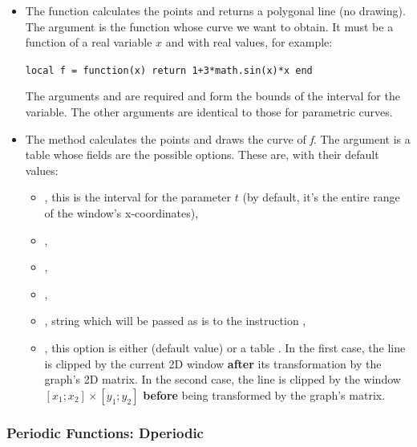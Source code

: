 \begin{itemize}
    \item The function  calculates the points and returns a polygonal line (no drawing). The argument  is the function whose curve we want to obtain. It must be a function of a real variable $x$ and with real values, for example:

\texttt{local f = function(x) return 1+3*math.sin(x)*x end}

The arguments  and  are required and form the bounds of the interval for the variable. The other arguments are identical to those for parametric curves.

    \item The method  calculates the points and draws the curve of \emph{f}.  The argument  is a table whose fields are the possible options. These are, with their default values:

\begin{itemize}
    \item {}, this is the interval for the parameter $t$ (by default, it's the entire range of the window's x-coordinates),
    \item {}, 
    \item {},
    \item {},
    \item {}, string which will be passed as is to the instruction \drawcmd,
    \item {}, this option is either \nil (default value) or a table . In the first case, the line is clipped by the current 2D window \textbf{after} its transformation by the graph's 2D matrix. In the second case, the line is clipped by the window $[x_1;x_2]\times[y_1;y_2]$ \textbf{before} being transformed by the graph's matrix.
\end{itemize}
\end{itemize}

\subsubsection{Periodic Functions: Dperiodic}

